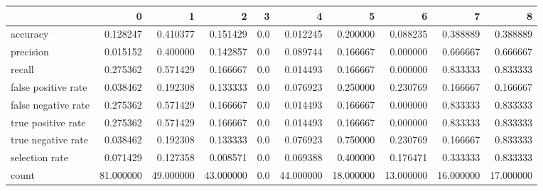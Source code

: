\begin{tabular}{lrrrrrrrrr}
\toprule
{} &          0 &          1 &          2 &    3 &          4 &          5 &          6 &          7 &          8 \\
\midrule
accuracy            &   0.128247 &   0.410377 &   0.151429 &  0.0 &   0.012245 &   0.200000 &   0.088235 &   0.388889 &   0.388889 \\
precision           &   0.015152 &   0.400000 &   0.142857 &  0.0 &   0.089744 &   0.166667 &   0.000000 &   0.666667 &   0.666667 \\
recall              &   0.275362 &   0.571429 &   0.166667 &  0.0 &   0.014493 &   0.166667 &   0.000000 &   0.833333 &   0.833333 \\
false positive rate &   0.038462 &   0.192308 &   0.133333 &  0.0 &   0.076923 &   0.250000 &   0.230769 &   0.166667 &   0.166667 \\
false negative rate &   0.275362 &   0.571429 &   0.166667 &  0.0 &   0.014493 &   0.166667 &   0.000000 &   0.833333 &   0.833333 \\
true positive rate  &   0.275362 &   0.571429 &   0.166667 &  0.0 &   0.014493 &   0.166667 &   0.000000 &   0.833333 &   0.833333 \\
true negative rate  &   0.038462 &   0.192308 &   0.133333 &  0.0 &   0.076923 &   0.750000 &   0.230769 &   0.166667 &   0.833333 \\
selection rate      &   0.071429 &   0.127358 &   0.008571 &  0.0 &   0.069388 &   0.400000 &   0.176471 &   0.333333 &   0.833333 \\
count               &  81.000000 &  49.000000 &  43.000000 &  0.0 &  44.000000 &  18.000000 &  13.000000 &  16.000000 &  17.000000 \\
\bottomrule
\end{tabular}
